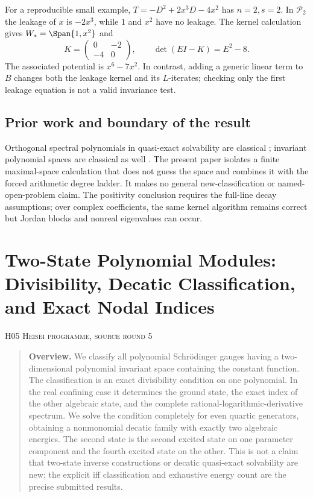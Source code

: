 \documentclass[11pt,a4paper]{article}
\theoremstyle{definition}\newtheorem{definition}[theorem]{Definition}
\theoremstyle{remark}\newtheorem{remark}[theorem]{Remark}
\newcommand{\Pcal}{\mathcal P}\newcommand{\PP}{\mathcal P}\newcommand{\Pp}{\mathcal P}
\numberwithin{equation}{section}
\begin{document}
For a reproducible small example, $T=-D^2+2x^3D-4x^2$ has $n=2,s=2$. In $\Pcal_2$ the leakage of $x$ is $-2x^3$, while $1$ and $x^2$ have no leakage. The kernel calculation gives $W_*=\Span\{1,x^2\}$ and
\[K=\begin{pmatrix}0&-2\\-4&0\end{pmatrix},\qquad\det(EI-K)=E^2-8.\]
The associated potential is $x^6-7x^2$. In contrast, adding a generic linear term to $B$ changes both the leakage kernel and its $L$-iterates; checking only the first leakage equation is not a valid invariance test.
\subsection{Prior work and boundary of the result}\label{H04-sec-6}
Orthogonal spectral polynomials in quasi-exact solvability are classical \cite{ref081}; invariant polynomial spaces are classical as well \cite{ref083}. The present paper isolates a finite maximal-space calculation that does not guess the space and combines it with the forced arithmetic degree ladder. It makes no general new-classification or named-open-problem claim. The positivity conclusion requires the full-line decay assumptions; over complex coefficients, the same kernel algorithm remains correct but Jordan blocks and nonreal eigenvalues can occur.




\clearpage
\section[H05 --- Two-State Polynomial Modules: Divisibility, Decatic Classification, and Exact Nodal Indices]{Two-State Polynomial Modules: Divisibility, Decatic Classification, and Exact Nodal Indices}\label{contrib-H05}
\noindent\textsc{H05 \quad Heisei programme, source round 5}\par\medskip






\begin{quote}\small\textbf{Overview.} We classify all polynomial Schr\"odinger gauges having a two-dimensional polynomial invariant space containing the constant function. The classification is an exact divisibility condition on one polynomial. In the real confining case it determines the ground state, the exact index of the other algebraic state, and the complete rational-logarithmic-derivative spectrum. We solve the condition completely for even quartic generators, obtaining a nonmonomial decatic family with exactly two algebraic energies. The second state is the second excited state on one parameter component and the fourth excited state on the other. This is not a claim that two-state inverse constructions or decatic quasi-exact solvability are new; the explicit iff classification and exhaustive energy count are the precise submitted results.\end{quote}
\end{document}
